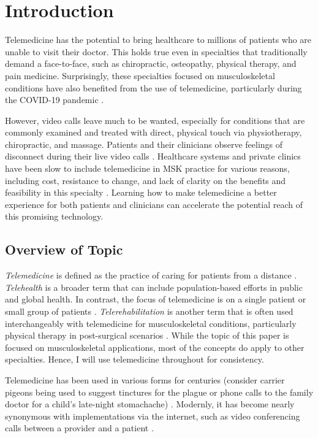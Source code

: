 \documentclass[utf8]{FrontiersinHarvard} %
\begin{document}
\section{Introduction}

Telemedicine has the potential to bring healthcare to millions of patients who are unable to visit their doctor. This holds true even in specialties that traditionally demand a face-to-face, such as chiropractic, osteopathy, physical therapy, and pain medicine. Surprisingly, these specialties focused on musculoskeletal conditions have also benefited from the use of telemedicine, particularly during the COVID-19 pandemic \citep{lamplotGoodComesEvil2021}.

However, video calls leave much to be wanted, especially for conditions that are commonly examined and treated with direct, physical touch via physiotherapy, chiropractic, and massage. Patients and their clinicians observe feelings of disconnect during their live video calls \citep{ahmadPatientPerspectivesTelemedicine2023}. Healthcare systems and private clinics have been slow to include telemedicine in MSK practice for various reasons, including cost, resistance to change, and lack of clarity on the benefits and feasibility in this specialty \citep{daviesInternationalCoreCapability2021}. Learning how to make telemedicine a better experience for both patients and clinicians can accelerate the potential reach of this promising technology.

\subsection{Overview of Topic}

\textit{Telemedicine} is defined as the practice of caring for patients from a distance \citep{jinTelemedicineCurrentImpact2020}. \textit{Telehealth} is a broader term that can include population-based efforts in public and global health. In contrast, the focus of telemedicine is on a single patient or small group of patients \citep{barberioTransitioningTelehealthTodays2021}. \textit{Telerehabilitation} is another term that is often used interchangeably with telemedicine for musculoskeletal conditions, particularly physical therapy in post-surgical scenarios \citep{baroniStateArtTelerehabilitation2023}. While the topic of this paper is focused on musculoskeletal applications, most of the concepts do apply to other specialties. Hence, I will use telemedicine throughout for consistency.

Telemedicine has been used in various forms for centuries (consider carrier pigeons being used to suggest tinctures for the plague or phone calls to the family doctor for a child's late-night stomachache) \citep{jinTelemedicineCurrentImpact2020}. Modernly, it has become nearly synonymous with implementations via the internet, such as video conferencing calls between a provider and a patient \citep{daviesInternationalCoreCapability2021}.
\end{document}
